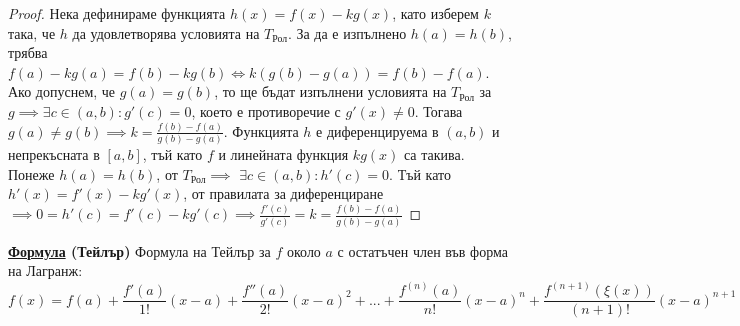 \documentclass{article}
\begin{document}
\begin{proof}
Нека дефинираме функцията $h(x) = f(x) - kg(x)$, като  изберем $k$ така, че $h$ да удовлетворява условията на $T_{\text{Рол}}$.
За да е изпълнено $h(a) = h(b)$, трябва $f(a) - kg(a) = f(b) - kg(b) \iff k(g(b) - g(a)) = f(b) - f(a)$. Ако допуснем, че $g(a) = g(b)$, то ще бъдат
изпълнени условията на $T_{\text{Рол}}$ за $g \implies \exists c \in (a, b) : g'(c) = 0$, което е противоречие с $g'(x) \neq 0$.
Тогава $g(a) \neq g(b) \implies k = \frac{f(b) - f(a)}{g(b) - g(a)}$. Функцията $h$ е
диференцируема в $(a, b)$ и непрекъсната в $[a, b]$, тъй като $f$ и линейната функция $kg(x)$ са такива. Понеже $h(a) = h(b)$, от $T_{\text{Рол}} \implies$
$\exists c \in (a, b) : h'(c) = 0$. Тъй като $h'(x) = f'(x) - kg'(x)$, от правилата за диференциране $\implies 0 = h'(c) =
f'(c) - kg'(c) \implies \frac{f'(c)}{g'(c)} = k = \frac{f(b) - f(a)}{g(b) - g(a)}$\newline
\end{proof}
\textbf{\underline{Формула} (Тейлър)} \newline
Формула на Тейлър за $f$ около $a$ с остатъчен член във форма на Лагранж:
$$f(x) = f(a) + \frac{f'(a)}{1!}(x - a) + \frac{f''(a)}{2!}(x - a)^2 + ... + \frac{f^{(n)}(a)}{n!}(x - a)^n + \frac{f^{(n + 1)}
(\xi(x))}{(n + 1)!}(x - a)^{n + 1}$$
\end{document}

